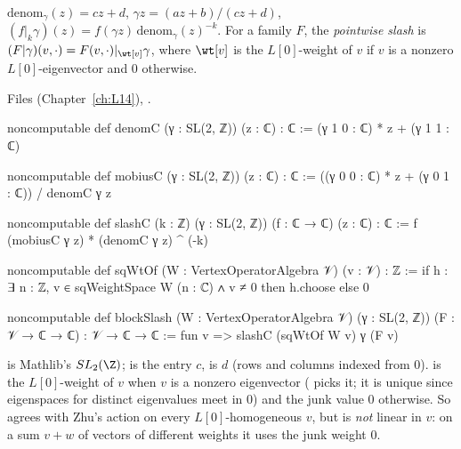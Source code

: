 \begin{definition}\label{l15:def:slash}
$\mathrm{denom}_\gamma(z)=cz+d$, $\gamma z=(az+b)/(cz+d)$, $(f|_k\gamma)(z)=f(\gamma z)\,\mathrm{denom}_\gamma(z)^{-k}$. For a
family $F$, the \emph{pointwise slash} is $(F|\gamma)(v,\cdot)=F(v,\cdot)|_{\wt[v]}\gamma$, where $\wt[v]$ is the $L[0]$-weight
of $v$ if $v$ is a nonzero $L[0]$-eigenvector and $0$ otherwise.
\end{definition}
\noindent Files  (Chapter~\ref{ch:L14}),
.
\begin{leancode}
noncomputable def denomC (γ : SL(2, ℤ)) (z : ℂ) : ℂ := (γ 1 0 : ℂ) * z + (γ 1 1 : ℂ)

noncomputable def mobiusC (γ : SL(2, ℤ)) (z : ℂ) : ℂ :=
  ((γ 0 0 : ℂ) * z + (γ 0 1 : ℂ)) / denomC γ z

noncomputable def slashC (k : ℤ) (γ : SL(2, ℤ)) (f : ℂ → ℂ) (z : ℂ) : ℂ :=
  f (mobiusC γ z) * (denomC γ z) ^ (-k)

noncomputable def sqWtOf (W : VertexOperatorAlgebra 𝒱) (v : 𝒱) : ℤ :=
  if h : ∃ n : ℤ, v ∈ sqWeightSpace W (n : ℂ) ∧ v ≠ 0 then h.choose else 0

noncomputable def blockSlash (W : VertexOperatorAlgebra 𝒱) (γ : SL(2, ℤ)) (F : 𝒱 → ℂ → ℂ) :
    𝒱 → ℂ → ℂ := fun v => slashC (sqWtOf W v) γ (F v)
\end{leancode}

\begin{dictionary}
 is Mathlib's $\lfifteenSL$;  is the entry $c$,  is $d$ (rows and columns indexed
from $0$).  is the $L[0]$-weight of $v$ when $v$ is a nonzero eigenvector ( picks it; it
is unique since eigenspaces for distinct eigenvalues meet in $0$) and the junk value $0$ otherwise. So
 agrees with Zhu's action on every $L[0]$-homogeneous $v$, but is \emph{not} linear in $v$: on a sum
$v+w$ of vectors of different weights it uses the junk weight $0$.
\end{dictionary}

